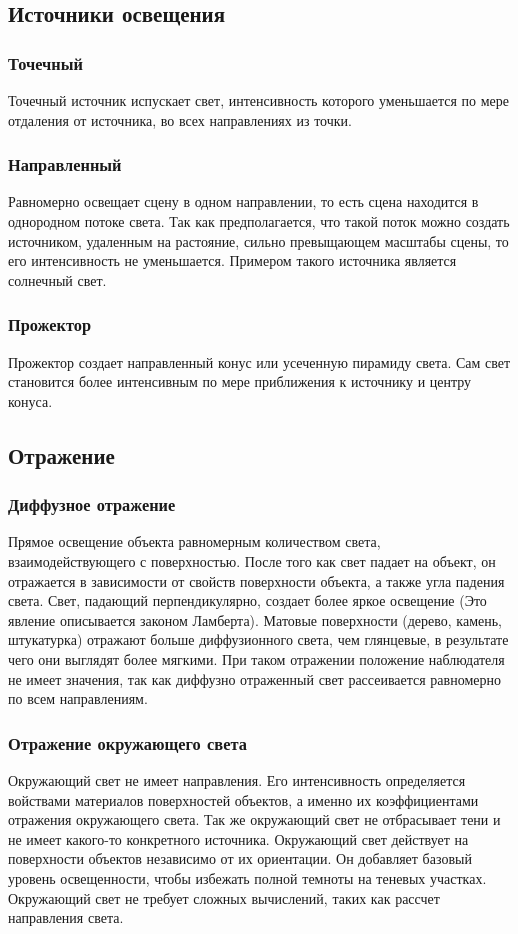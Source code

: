 \subsection{Источники освещения}
\subsubsection{Точечный}
Точечный источник испускает свет, интенсивность которого уменьшается по мере отдаления от источника, во всех направлениях из точки.

\subsubsection{Направленный}
Равномерно освещает сцену в одном направлении, то есть сцена находится в однородном потоке света. Так как предполагается, что такой поток можно создать источником, удаленным на растояние, сильно превыщающем масштабы сцены, то его интенсивность не уменьшается. Примером такого источника является солнечный свет.

\subsubsection{Прожектор}
Прожектор создает направленный конус или усеченную пирамиду света. Сам свет становится более интенсивным по мере приближения к источнику и центру конуса.


\subsection{Отражение}
\subsubsection{Диффузное отражение}
Прямое освещение объекта равномерным количеством света, взаимодействующего с поверхностью. После того как свет падает на объект, он отражается в зависимости от свойств поверхности объекта, а также угла падения света. Свет, падающий перпендикулярно, создает более яркое освещение (Это явление описывается законом Ламберта). Матовые поверхности (дерево, камень, штукатурка) отражают больше диффузионного света, чем глянцевые, в результате чего они выглядят более мягкими.
При таком отражении положение наблюдателя не имеет значения, так как диффузно отраженный свет рассеивается равномерно по всем направлениям.

\subsubsection{Отражение окружающего света}
Окружающий свет не имеет направления. Его интенсивность определяется войствами материалов поверхностей объектов, а именно их коэффициентами отражения окружающего света.
Так же окружающий свет не отбрасывает тени и не имеет какого-то конкретного источника.
Окружающий свет действует на поверхности объектов независимо от их ориентации. Он добавляет базовый уровень освещенности, чтобы избежать полной темноты на теневых участках. Окружающий свет не требует сложных вычислений, таких как рассчет направления света.
 
